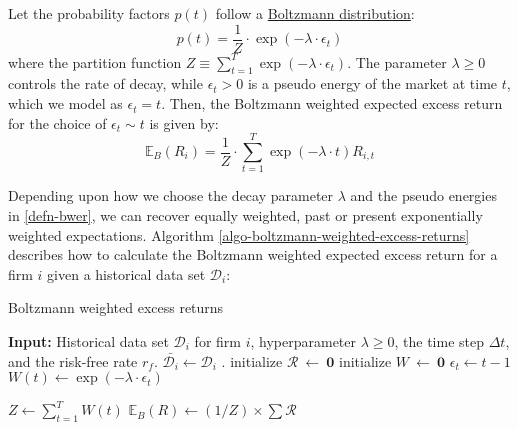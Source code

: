 \documentclass[11pt]{article}
\theoremstyle{definition}
\begin{document}
\begin{definition}\label{defn-bwer}
Let the probability factors $p(t)$ follow a \href{https://en.wikipedia.org/wiki/Boltzmann_distribution}{Boltzmann distribution}:
\begin{equation*}\label{eqn-boltzmann-weight}
    p(t) = \frac{1}{Z}\cdot\exp(-\lambda\cdot\epsilon_{t})
\end{equation*}
where the partition function $Z \equiv \sum_{t=1}^{T}\exp(-\lambda\cdot\epsilon_{t})$.
The parameter $\lambda\geq{0}$ controls the rate of decay, while $\epsilon_{t}>0$ is a pseudo energy of the market at time $t$, 
which we model as $\epsilon_{t} = t$. Then, the Boltzmann weighted expected excess return for the choice of $\epsilon_{t} \sim t$ is given by: 
\begin{equation*}\label{eqn-boltzmann-weight-expectation}
    \mathbb{E}_{B}\left(R_{i}\right) = \frac{1}{Z}\cdot\sum_{t=1}^{T}\exp\left(-\lambda\cdot{t}\right){R}_{i,t}
\end{equation*}
\end{definition}
Depending upon how we choose the decay parameter $\lambda$ and the pseudo energies in \ref{defn-bwer}, we can recover 
equally weighted, past or present exponentially weighted expectations. Algorithm \ref{algo-boltzmann-weighted-excess-returns} 
describes how to calculate the Boltzmann weighted expected excess return for a firm $i$ given a historical data set $\mathcal{D}_{i}$:
\begin{algorithm}[h]
\caption{Boltzmann weighted excess returns}\label{algo-boltzmann-weighted-excess-returns}
\begin{algorithmic}[1]
\State \textbf{Input:} Historical data set $\mathcal{D}_{i}$ for firm $i$, hyperparameter $\lambda\geq{0}$, the time step $\Delta{t}$,
and the risk-free rate $r_{f}$.
\Statex
{}
\Statex
\State $\bar{\mathcal{D}_{i}}\leftarrow\mathcal{D}_{i}$ .
\State initialize $\mathcal{R}~\leftarrow~\mathbf{0}$ 
\State initialize $W~\leftarrow~\mathbf{0}$ 
\Statex
{}
\State $\epsilon_{t} \leftarrow t - 1$ 
\State $W(t) \leftarrow \exp(-\lambda\cdot\epsilon_{t})$ 
\EndFor

\Statex
\State $Z \leftarrow \sum_{t=1}^{T}W(t)$ 
\State $\mathbb{E}_{B}\left(R\right)\leftarrow(1/Z)\times\sum\mathcal{R}$ 
\EndProcedure
\end{algorithmic}
\end{algorithm}
\end{document}
